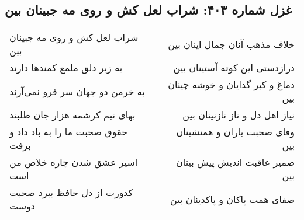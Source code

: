 \begin{center}
\section*{غزل شماره ۴۰۳: شراب لعل کش و روی مه جبینان بین}
\label{sec:sh403}
\begin{longtable}{l p{0.5cm} r}
شراب لعل کش و روی مه جبینان بین
&&
خلاف مذهب آنان جمال اینان بین
\\
به زیر دلق ملمع کمندها دارند
&&
درازدستی این کوته آستینان بین
\\
به خرمن دو جهان سر فرو نمی‌آرند
&&
دماغ و کبر گدایان و خوشه چینان بین
\\
بهای نیم کرشمه هزار جان طلبند
&&
نیاز اهل دل و ناز نازنینان بین
\\
حقوق صحبت ما را به باد داد و برفت
&&
وفای صحبت یاران و همنشینان بین
\\
اسیر عشق شدن چاره خلاص من است
&&
ضمیر عاقبت اندیش پیش بینان بین
\\
کدورت از دل حافظ ببرد صحبت دوست
&&
صفای همت پاکان و پاکدینان بین
\\
\end{longtable}
\end{center}
